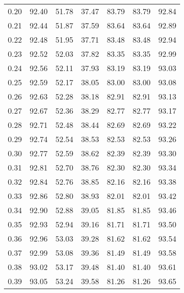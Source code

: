 \begin{tabular}{|c|c|c|c|c|c|c|}
      0.20 &     92.40 &     51.78 &      37.47 &   83.79 &      83.79 &         92.84 \\
      0.21 &     92.44 &     51.87 &      37.59 &   83.64 &      83.64 &         92.89 \\
      0.22 &     92.48 &     51.95 &      37.71 &   83.48 &      83.48 &         92.94 \\
      0.23 &     92.52 &     52.03 &      37.82 &   83.35 &      83.35 &         92.99 \\
      0.24 &     92.56 &     52.11 &      37.93 &   83.19 &      83.19 &         93.03 \\
      0.25 &     92.59 &     52.17 &      38.05 &   83.00 &      83.00 &         93.08 \\
      0.26 &     92.63 &     52.28 &      38.18 &   82.91 &      82.91 &         93.13 \\
      0.27 &     92.67 &     52.36 &      38.29 &   82.77 &      82.77 &         93.17 \\
      0.28 &     92.71 &     52.48 &      38.44 &   82.69 &      82.69 &         93.22 \\
      0.29 &     92.74 &     52.54 &      38.53 &   82.53 &      82.53 &         93.26 \\
      0.30 &     92.77 &     52.59 &      38.62 &   82.39 &      82.39 &         93.30 \\
      0.31 &     92.81 &     52.70 &      38.76 &   82.30 &      82.30 &         93.34 \\
      0.32 &     92.84 &     52.76 &      38.85 &   82.16 &      82.16 &         93.38 \\
      0.33 &     92.86 &     52.80 &      38.93 &   82.01 &      82.01 &         93.42 \\
      0.34 &     92.90 &     52.88 &      39.05 &   81.85 &      81.85 &         93.46 \\
      0.35 &     92.93 &     52.94 &      39.16 &   81.71 &      81.71 &         93.50 \\
      0.36 &     92.96 &     53.03 &      39.28 &   81.62 &      81.62 &         93.54 \\
      0.37 &     92.99 &     53.08 &      39.36 &   81.49 &      81.49 &         93.58 \\
      0.38 &     93.02 &     53.17 &      39.48 &   81.40 &      81.40 &         93.61 \\
      0.39 &     93.05 &     53.24 &      39.58 &   81.26 &      81.26 &         93.65 \\

\end{tabular}
